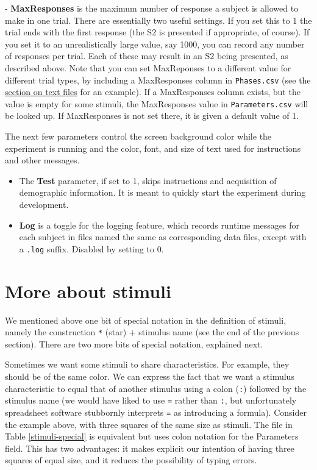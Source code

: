 \documentclass[11pt,]{article}
\begin{document}
\label{maxresponses} - \textbf{MaxResponses} is the maximum number of
response a subject is allowed to make in one trial. There are
essentially two useful settings. If you set this to 1 the trial ends
with the first response (the S2 is presented if appropriate, of course).
If you set it to an unrealistically large value, say 1000, you can
record any number of responses per trial. Each of these may result in an
S2 being presented, as described above. Note that you can set
MaxReponses to a different value for different trial types, by including
a MaxResponses column in \texttt{Phases.csv} (see the
\hyperref[textfiles]{section on text files} for an example). If a
MaxResponses column exists, but the value is empty for some stimuli, the
MaxResponses value in \texttt{Parameters.csv} will be looked up. If
MaxResponses is not set there, it is given a default value of 1.

The next few parameters control the screen background color while the
experiment is running and the color, font, and size of text used for
instructions and other messages.

\begin{itemize}
\item
  The \textbf{Test} parameter, if set to 1, skips instructions and
  acquisition of demographic information. It is meant to quickly start
  the experiment during development.
\item
  \textbf{Log} is a toggle for the logging feature, which records
  runtime messages for each subject in files named the same as
  corresponding data files, except with a \texttt{.log} suffix. Disabled
  by setting to 0.
\end{itemize}

\section{More about stimuli}\label{more-about-stimuli}

We mentioned above one bit of special notation in the definition of
stimuli, namely the construction \texttt{*} (star) + stimulus name (see
the end of the previous section). There are two more bits of special
notation, explained next.

Sometimes we want some stimuli to share characteristics. For example,
they should be of the same color. We can express the fact that we want a
stimulus characteristic to equal that of another stimulus using a colon
(\texttt{:}) followed by the stimulus name (we would have liked to use
\texttt{=} rather than \texttt{:}, but unfortunately spreadsheet
software stubbornly interprets \texttt{=} as introducing a formula).
Consider the example above, with three squares of the same size as
stimuli. The file in Table \ref{stimuli-special} is equivalent but uses
colon notation for the Parameters field. This has two advantages: it
makes explicit our intention of having three squares of equal size, and
it reduces the possibility of typing errors.
\end{document}
